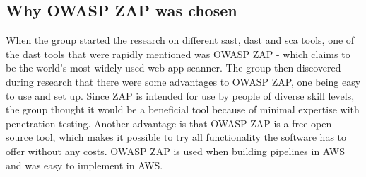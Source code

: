 \subsection{Why OWASP ZAP was chosen}
When the group started the research on different \acrshort{sast}, \acrshort{dast} and \acrshort{sca} tools, one of the \acrshort{dast} tools that were rapidly mentioned was OWASP ZAP - which claims to be the world's most widely used web app scanner. 
The group then discovered during research that there were some advantages to OWASP ZAP, one being easy to use and set up. Since ZAP is intended for use by people of diverse skill levels, the group thought it would be a beneficial tool because of minimal expertise with penetration testing. Another advantage is that OWASP ZAP is a free open-source tool, which makes it possible to try all functionality the software has to offer without any costs. OWASP ZAP is used when building pipelines in AWS and was easy to implement in AWS.

